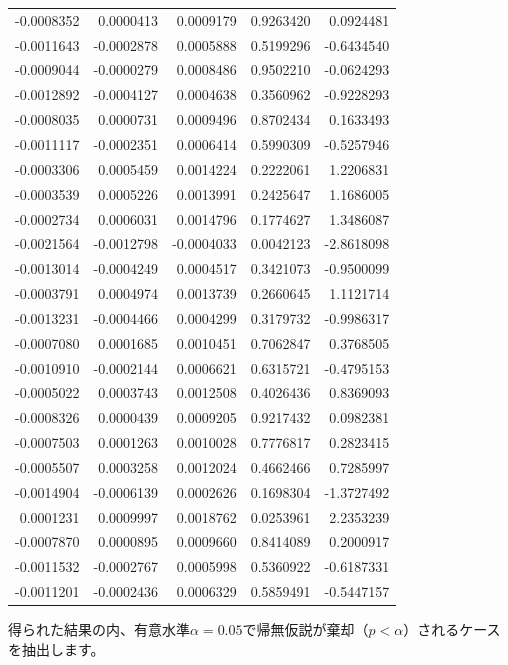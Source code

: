 \documentclass[]{tufte-handout}
\begin{document}
\begin{longtable}[]{@{}rrrrr@{}}
-0.0008352 & 0.0000413 & 0.0009179 & 0.9263420 & 0.0924481 \\
-0.0011643 & -0.0002878 & 0.0005888 & 0.5199296 & -0.6434540 \\
-0.0009044 & -0.0000279 & 0.0008486 & 0.9502210 & -0.0624293 \\
-0.0012892 & -0.0004127 & 0.0004638 & 0.3560962 & -0.9228293 \\
-0.0008035 & 0.0000731 & 0.0009496 & 0.8702434 & 0.1633493 \\
-0.0011117 & -0.0002351 & 0.0006414 & 0.5990309 & -0.5257946 \\
-0.0003306 & 0.0005459 & 0.0014224 & 0.2222061 & 1.2206831 \\
-0.0003539 & 0.0005226 & 0.0013991 & 0.2425647 & 1.1686005 \\
-0.0002734 & 0.0006031 & 0.0014796 & 0.1774627 & 1.3486087 \\
-0.0021564 & -0.0012798 & -0.0004033 & 0.0042123 & -2.8618098 \\
-0.0013014 & -0.0004249 & 0.0004517 & 0.3421073 & -0.9500099 \\
-0.0003791 & 0.0004974 & 0.0013739 & 0.2660645 & 1.1121714 \\
-0.0013231 & -0.0004466 & 0.0004299 & 0.3179732 & -0.9986317 \\
-0.0007080 & 0.0001685 & 0.0010451 & 0.7062847 & 0.3768505 \\
-0.0010910 & -0.0002144 & 0.0006621 & 0.6315721 & -0.4795153 \\
-0.0005022 & 0.0003743 & 0.0012508 & 0.4026436 & 0.8369093 \\
-0.0008326 & 0.0000439 & 0.0009205 & 0.9217432 & 0.0982381 \\
-0.0007503 & 0.0001263 & 0.0010028 & 0.7776817 & 0.2823415 \\
-0.0005507 & 0.0003258 & 0.0012024 & 0.4662466 & 0.7285997 \\
-0.0014904 & -0.0006139 & 0.0002626 & 0.1698304 & -1.3727492 \\
0.0001231 & 0.0009997 & 0.0018762 & 0.0253961 & 2.2353239 \\
-0.0007870 & 0.0000895 & 0.0009660 & 0.8414089 & 0.2000917 \\
-0.0011532 & -0.0002767 & 0.0005998 & 0.5360922 & -0.6187331 \\
-0.0011201 & -0.0002436 & 0.0006329 & 0.5859491 & -0.5447157 \\
\bottomrule
\end{longtable}

得られた結果の内、有意水準\(\alpha = 0.05\)で帰無仮説が棄却（\(p < \alpha\)）されるケースを抽出します。
\end{document}
